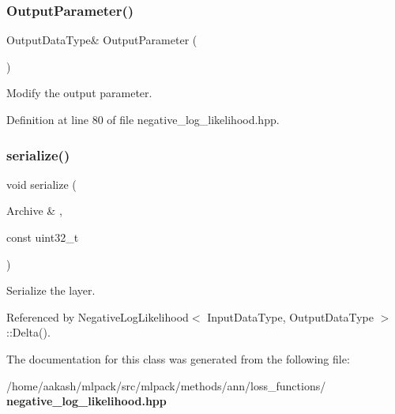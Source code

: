 \mbox{\label{classmlpack_1_1ann_1_1NegativeLogLikelihood_a21d5f745f02c709625a4ee0907f004a5}} 
\subsubsection{Output\+Parameter()\hspace{0.1cm}{\footnotesize\ttfamily [2/2]}}
{\footnotesize\ttfamily Output\+Data\+Type\& Output\+Parameter (\begin{DoxyParamCaption}{ }\end{DoxyParamCaption})\hspace{0.3cm}{\ttfamily [inline]}}



Modify the output parameter. 



Definition at line 80 of file negative\+\_\+log\+\_\+likelihood.\+hpp.

\mbox{\label{classmlpack_1_1ann_1_1NegativeLogLikelihood_aa2ccb5a0533a6ba0abe6dfc1f98fbafb}} 
\subsubsection{serialize()}
{\footnotesize\ttfamily void serialize (\begin{DoxyParamCaption}\item[{Archive \&}]{,  }\item[{const uint32\+\_\+t}]{ }\end{DoxyParamCaption})}



Serialize the layer. 



Referenced by Negative\+Log\+Likelihood$<$ Input\+Data\+Type, Output\+Data\+Type $>$\+::\+Delta().



The documentation for this class was generated from the following file\+:\begin{DoxyCompactItemize}
\item 
/home/aakash/mlpack/src/mlpack/methods/ann/loss\+\_\+functions/\textbf{ negative\+\_\+log\+\_\+likelihood.\+hpp}\end{DoxyCompactItemize}
